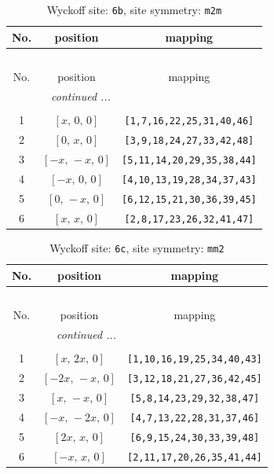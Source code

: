 \documentclass[fleqn,8pt]{jsarticle}
\begin{document}
\renewcommand{\arraystretch}{1.2}
\begin{longtable}{ccc}
\caption{Wyckoff site: {\tt 6b}, site symmetry: {\tt m2m}}
 \\
 \hline \hline
No. & position & mapping \\ \hline \endfirsthead

\multicolumn{2}{l}{\tablename\ \thetable{}} \\
 \hline \hline
No. & position & mapping \\ \hline \endhead

 \hline \hline
\multicolumn{2}{r}{\footnotesize\it continued ...} \\ \endfoot

 \hline \hline
\multicolumn{2}{r}{} \\ \endlastfoot

1 & $\left[ x,\, 0,\, 0 \right]$ & {\tt [1,7,16,22,25,31,40,46]} \\ \hline
2 & $\left[ 0,\, x,\, 0 \right]$ & {\tt [3,9,18,24,27,33,42,48]} \\ \hline
3 & $\left[ - x,\, - x,\, 0 \right]$ & {\tt [5,11,14,20,29,35,38,44]} \\ \hline
4 & $\left[ - x,\, 0,\, 0 \right]$ & {\tt [4,10,13,19,28,34,37,43]} \\ \hline
5 & $\left[ 0,\, - x,\, 0 \right]$ & {\tt [6,12,15,21,30,36,39,45]} \\ \hline
6 & $\left[ x,\, x,\, 0 \right]$ & {\tt [2,8,17,23,26,32,41,47]} \\
\end{longtable}
\renewcommand{\arraystretch}{1.2}
\begin{longtable}{ccc}
\caption{Wyckoff site: {\tt 6c}, site symmetry: {\tt mm2}}
 \\
 \hline \hline
No. & position & mapping \\ \hline \endfirsthead

\multicolumn{2}{l}{\tablename\ \thetable{}} \\
 \hline \hline
No. & position & mapping \\ \hline \endhead

 \hline \hline
\multicolumn{2}{r}{\footnotesize\it continued ...} \\ \endfoot

 \hline \hline
\multicolumn{2}{r}{} \\ \endlastfoot

1 & $\left[ x,\, 2 x,\, 0 \right]$ & {\tt [1,10,16,19,25,34,40,43]} \\ \hline
2 & $\left[ - 2 x,\, - x,\, 0 \right]$ & {\tt [3,12,18,21,27,36,42,45]} \\ \hline
3 & $\left[ x,\, - x,\, 0 \right]$ & {\tt [5,8,14,23,29,32,38,47]} \\ \hline
4 & $\left[ - x,\, - 2 x,\, 0 \right]$ & {\tt [4,7,13,22,28,31,37,46]} \\ \hline
5 & $\left[ 2 x,\, x,\, 0 \right]$ & {\tt [6,9,15,24,30,33,39,48]} \\ \hline
6 & $\left[ - x,\, x,\, 0 \right]$ & {\tt [2,11,17,20,26,35,41,44]} \\
\end{longtable}
\end{document}
